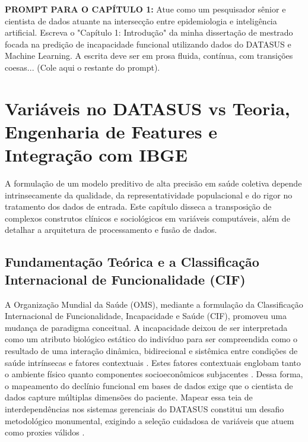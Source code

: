 \documentclass[12pt,openright,oneside,a4paper,brazil]{abntex2}
\begin{document}
\begin{mdframed}[backgroundcolor=gray!10]
\textbf{PROMPT PARA O CAPÍTULO 1:} Atue como um pesquisador sênior e cientista de dados atuante na intersecção entre epidemiologia e inteligência artificial. Escreva o "Capítulo 1: Introdução" da minha dissertação de mestrado focada na predição de incapacidade funcional utilizando dados do DATASUS e Machine Learning. A escrita deve ser em prosa fluida, contínua, com transições coesas... (Cole aqui o restante do prompt).
\end{mdframed}

\chapter{Variáveis no DATASUS vs Teoria, Engenharia de Features e Integração com IBGE}

A formulação de um modelo preditivo de alta precisão em saúde coletiva depende intrinsecamente da qualidade, da representatividade populacional e do rigor no tratamento dos dados de entrada. Este capítulo disseca a transposição de complexos construtos clínicos e sociológicos em variáveis computáveis, além de detalhar a arquitetura de processamento e fusão de dados.

\section{Fundamentação Teórica e a Classificação Internacional de Funcionalidade (CIF)}
A Organização Mundial da Saúde (OMS), mediante a formulação da Classificação Internacional de Funcionalidade, Incapacidade e Saúde (CIF), promoveu uma mudança de paradigma conceitual. A incapacidade deixou de ser interpretada como um atributo biológico estático do indivíduo para ser compreendida como o resultado de uma interação dinâmica, bidirecional e sistêmica entre condições de saúde intrínsecas e fatores contextuais \cite{ref19}. Estes fatores contextuais englobam tanto o ambiente físico quanto componentes socioeconômicos subjacentes \cite{ref19, ref20}. Dessa forma, o mapeamento do declínio funcional em bases de dados exige que o cientista de dados capture múltiplas dimensões do paciente. Mapear essa teia de interdependências nos sistemas gerenciais do DATASUS constitui um desafio metodológico monumental, exigindo a seleção cuidadosa de variáveis que atuem como proxies válidos \cite{ref19}.
\end{document}

